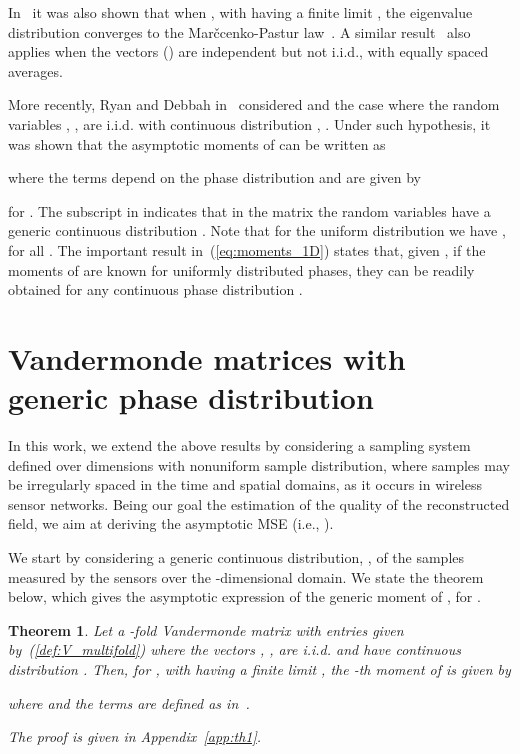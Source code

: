 \documentclass[11pt, draftcls, onecolumn, a4paper]{IEEEtran}
\newtheorem{theorem}{Theorem}[section]
\begin{document}
In~\cite{TSP2} it was also shown that when ,
with  having a finite limit , the eigenvalue
distribution  converges to the
Mar\v{c}cenko-Pastur law~\cite{MarcenkoPastur}. A similar
result~\cite{TSP3} also applies when the vectors 
() are independent but not i.i.d., with equally spaced
averages.

More recently, Ryan and Debbah in~\cite{RyanDebbah} considered 
and the case where the random variables , , are
i.i.d. with continuous distribution , . Under
such hypothesis, it was shown that the asymptotic moments of
 can be written as
 
where the terms  depend on the phase distribution  and
are given by

for .  The subscript  in  indicates
that in the matrix  the random variables  have
a generic continuous distribution .  
Note that for the uniform distribution we
have , for all . The important result
in~(\ref{eq:moments_1D}) states that, given , if the moments of
 are known for uniformly distributed phases, they can be
readily obtained for any continuous phase distribution .



\section{Vandermonde matrices with generic phase distribution}
\label{sec:results-vandermonde} 

In this work, we extend the above results by considering a sampling
system defined over  dimensions with nonuniform sample
distribution, where samples may be irregularly spaced in the time and
spatial domains, as it occurs in wireless sensor networks.  Being our
goal the estimation of the quality of the reconstructed field, we aim
at deriving the asymptotic MSE (i.e.,
).


We start by considering a generic continuous distribution,
,  of the samples measured by the sensors over
the -dimensional domain.  We state the theorem below, which gives
the asymptotic expression of the generic moment of , for
.


\begin{theorem}
\label{th:1}
Let  a -fold  Vandermonde matrix with entries
given by~(\ref{def:V_multifold}) where the vectors ,
, are i.i.d. and have continuous distribution
.  Then, for , with  
having a finite limit , 
the -th moment of  is given by

where  and the terms 
are defined as in~\cite{TSP2}. 

The proof is given in Appendix~\ref{app:th1}.
\end{theorem}
\end{document}
